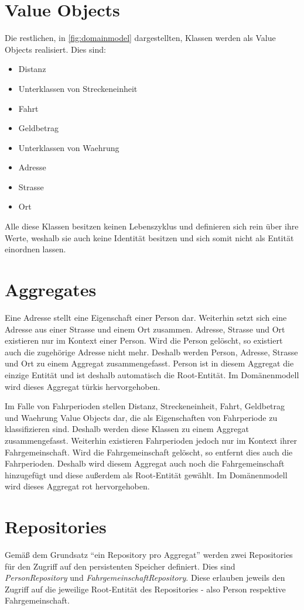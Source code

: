 \section{Value Objects}
Die restlichen, in \autoref{fig:domainmodel} dargestellten, Klassen werden als Value Objects realisiert.
Dies sind:

\begin{itemize}
    \item Distanz
    \item Unterklassen von Streckeneinheit
    \item Fahrt
    \item Geldbetrag
    \item Unterklassen von Waehrung
    \item Adresse
    \item Strasse
    \item Ort
\end{itemize}

Alle diese Klassen besitzen keinen Lebenszyklus und definieren sich rein über ihre Werte, weshalb sie auch keine Identität besitzen und sich somit nicht als Entität einordnen lassen.

\section{Aggregates}
Eine Adresse stellt eine Eigenschaft einer Person dar.
Weiterhin setzt sich eine Adresse aus einer Strasse und einem Ort zusammen.
Adresse, Strasse und Ort existieren nur im Kontext einer Person.
Wird die Person gelöscht, so existiert auch die zugehörige Adresse nicht mehr.
Deshalb werden Person, Adresse, Strasse und Ort zu einem Aggregat zusammengefasst.
Person ist in diesem Aggregat die einzige Entität und ist deshalb automatisch die Root-Entität.
Im Domänenmodell wird dieses Aggregat türkis hervorgehoben.

Im Falle von Fahrperioden stellen Distanz, Streckeneinheit, Fahrt, Geldbetrag und Waehrung Value Objects dar, die als Eigenschaften von Fahrperiode zu klassifizieren sind.
Deshalb werden diese Klassen zu einem Aggregat zusammengefasst.
Weiterhin existieren Fahrperioden jedoch nur im Kontext ihrer Fahrgemeinschaft.
Wird die Fahrgemeinschaft gelöscht, so entfernt dies auch die Fahrperioden.
Deshalb wird diesem Aggregat auch noch die Fahrgemeinschaft hinzugefügt und diese außerdem als Root-Entität gewählt.
Im Domänenmodell wird dieses Aggregat rot hervorgehoben.

\section{Repositories}
Gemäß dem Grundsatz \enquote{ein Repository pro Aggregat} werden zwei Repositories für den Zugriff auf den persistenten Speicher definiert.
Dies sind \emph{PersonRepository} und \emph{FahrgemeinschaftRepository}.
Diese erlauben jeweils den Zugriff auf die jeweilige Root-Entität des Repositories - also Person respektive Fahrgemeinschaft.
